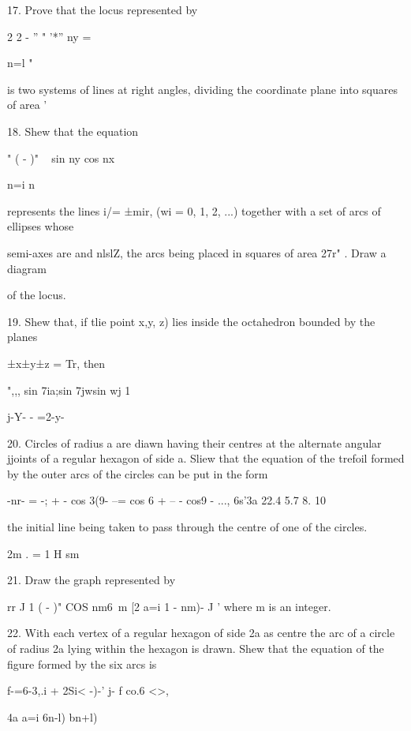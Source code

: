 {

17. Prove that the locus represented by

2 2 - '' " '*'' ny =

n=l "

is two systems of lines at right angles, dividing the coordinate plane
into squares of area \pi'\ 

18. Shew that the equation

" ( - )" ~ sin ny cos nx \

n=i n ~

represents the lines i/= ±mir, (wi = 0, 1, 2, ...) together with a set
of arcs of ellipses whose

semi-axes are \pi and nlslZ, the arcs being placed in squares of area
27r" . Draw a diagram

of the locus. 

19. Shew that, if tlie point x,y, z) lies inside the octahedron
bounded by the planes

±x±y±z = Tr, then

",,, sin 7ia;sin 7jwsin wj 1

 j-Y- - =2-y-


20. Circles of radius a are diawn having their centres at the
alternate angular jjoints of a regular hexagon of side a. Sliew that
the equation of the trefoil formed by the outer arcs of the circles
can be put in the form

-nr- = -; + - cos 3(9- --= cos 6 + -- - cos9 - ..., 6s'3a 22.4 5.7 8.
10

the initial line being taken to pass through the centre of one of the
circles.


2m . = 1 H sm

%
%

21. Draw the graph represented by

rr J 1 ( - )" COS nm6\ m [2 a=i 1 - nm)- J ' where m is an integer.

22. With each vertex of a regular hexagon of side 2a as centre the arc
of a circle of radius 2a lying within the hexagon is drawn. Shew that
the equation of the figure formed by the six arcs is

f-=6-3,.i + 2Si< -)-' j- f co.6 <>,

4a a=i 6n-l) bn+l)

}
